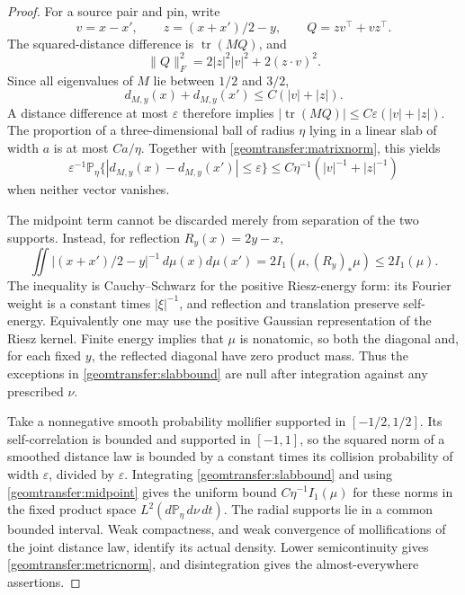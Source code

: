 \begin{proof}
For a source pair and pin, write
\[
 v=x-x',\qquad z=(x+x')/2-y,
 \qquad Q=zv^{\top}+vz^{\top}.
\]
The squared-distance difference is \(\operatorname{tr}(MQ)\), and
\begin{equation}\label{geomtransfer:matrixnorm}
 \|Q\|_F^2=2|z|^2|v|^2+2(z\cdot v)^2.
\end{equation}
Since all eigenvalues of \(M\) lie between \(1/2\) and \(3/2\),
\[
 d_{M,y}(x)+d_{M,y}(x')\le C(|v|+|z|).
\]
A distance difference at most \(\varepsilon\) therefore implies
\( |\operatorname{tr}(MQ)|\le C\varepsilon(|v|+|z|)\).
The proportion of a three-dimensional ball of radius \(\eta\)
lying in a linear slab of width \(a\) is at most \(Ca/\eta\).
Together with \eqref{geomtransfer:matrixnorm}, this yields
\begin{equation}\label{geomtransfer:slabbound}
 \varepsilon^{-1}\mathbb P_\eta
 \{|d_{M,y}(x)-d_{M,y}(x')|\le\varepsilon\}
 \le C\eta^{-1}(|v|^{-1}+|z|^{-1})
\end{equation}
when neither vector vanishes.

The midpoint term cannot be discarded merely from separation of the two
supports. Instead, for reflection \(R_y(x)=2y-x\),
\begin{equation}\label{geomtransfer:midpoint}
 \iint |(x+x')/2-y|^{-1}\,d\mu(x)d\mu(x')
 =2I_1(\mu,(R_y)_*\mu)\le2I_1(\mu).
\end{equation}
The inequality is Cauchy--Schwarz for the positive Riesz-energy form:
its Fourier weight is a constant times \(|\xi|^{-1}\), and reflection
and translation preserve self-energy. Equivalently one may use the
positive Gaussian representation of the Riesz kernel. Finite energy
implies that \(\mu\) is nonatomic, so both the diagonal and, for each
fixed \(y\), the reflected diagonal have zero product mass. Thus the
exceptions in \eqref{geomtransfer:slabbound} are null after integration
against any prescribed \(\nu\).

Take a nonnegative smooth probability mollifier supported in
\([-1/2,1/2]\). Its self-correlation is bounded and supported in
\([-1,1]\), so the squared norm of a smoothed distance law is bounded
by a constant times its collision probability of width
\(\varepsilon\), divided by \(\varepsilon\). Integrating
\eqref{geomtransfer:slabbound} and using
\eqref{geomtransfer:midpoint} gives the uniform bound
\(C\eta^{-1}I_1(\mu)\) for these norms in the fixed product space
\(L^2(d\mathbb P_\eta\,d\nu\,dt)\).
The radial supports lie in a common bounded interval. Weak compactness,
and weak convergence of mollifications of the joint distance law,
identify its actual density. Lower semicontinuity gives
\eqref{geomtransfer:metricnorm}, and disintegration gives the
almost-everywhere assertions.
\end{proof}

